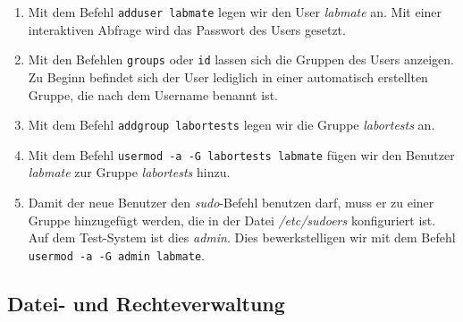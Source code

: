 \documentclass{scrartcl}
\begin{document}
    \begin{enumerate}[1.]
        \item Mit dem Befehl \texttt{adduser labmate} legen wir den User
              \textit{labmate} an. Mit einer interaktiven Abfrage wird das
              Passwort des Users gesetzt.
        \item Mit den Befehlen \texttt{groups} oder \texttt{id} lassen sich die
              Gruppen des Users anzeigen. Zu Beginn befindet sich der User
              lediglich in einer automatisch erstellten Gruppe, die nach dem
              Username benannt ist.
        \item Mit dem Befehl \texttt{addgroup labortests} legen wir die Gruppe
              \textit{labortests} an.
        \item Mit dem Befehl \texttt{usermod -a -G labortests labmate} fügen wir
              den Benutzer \textit{labmate} zur Gruppe \textit{labortests} hinzu.
        \item Damit der neue Benutzer den \textit{sudo}-Befehl benutzen darf,
              muss er zu einer Gruppe hinzugefügt werden, die in der Datei
              \textit{/etc/sudoers} konfiguriert ist. Auf dem Test-System ist
              dies \textit{admin}. Dies bewerkstelligen wir mit dem Befehl
              \texttt{usermod -a -G admin labmate}.
    \end{enumerate}

    \subsection{Datei- und Rechteverwaltung}
    \label{sub:Datei- und Rechteverwaltung}
\end{document}
